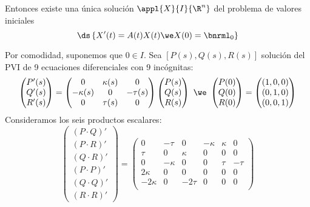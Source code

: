 \begin{teo}[Existencia]
\begin{dem}
\begin{lem}
			Entonces existe una única solución $\appl{X}{I}{\R^n}$ del problema de valores iniciales \[\ds \left\{X'(t)=A(t)X(t) \we X(0)=\bnrml_0\right\}\]
		\end{lem}
		Por comodidad, suponemos que $0\in I$. Sea $\left[P(s), Q(s), R(s)\right]$ solución del PVI de 9 ecuaciones diferenciales con 9 incógnitas:
		\[\begin{pmatrix}
				P'(s) \\ Q'(s) \\ R'(s)
			\end{pmatrix} = \begin{pmatrix}
				0          & \kappa(s) & 0        \\
				-\kappa(s) & 0         & -\tau(s) \\
				0          & \tau(s)   & 0
			\end{pmatrix}\begin{pmatrix}
				P(s) \\ Q(s) \\ R(s)
			\end{pmatrix} \,\, \we \,\, \begin{pmatrix}
				P(0) \\ Q(0) \\ R(0)
			\end{pmatrix} = \begin{pmatrix}
				(1,0,0) \\ (0,1,0) \\ (0,0,1)
			\end{pmatrix}\]
		Consideramos los seis productos escalares:
		\[\begin{pmatrix} (P \cdot Q)' \\ (P \cdot R)' \\ (Q \cdot R)' \\ (P \cdot P)' \\ (Q \cdot Q)' \\ (R \cdot R)' \end{pmatrix} = \begin{pmatrix} 0        & - \tau   & 0      & - \kappa & \kappa & 0      \\
                \tau     & 0        & \kappa & 0        & 0      & 0      \\
                0        & - \kappa & 0      & 0        & \tau   & - \tau \\
                2\kappa  & 0        & 0      & 0        & 0      & 0      \\
                -2\kappa & 0        & -2\tau & 0        & 0      & 0      \\

\end{pmatrix}\]
\end{dem}
\end{teo}
